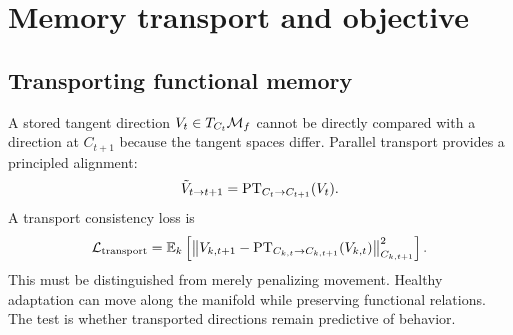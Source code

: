 \section{Memory transport and objective}

\subsection{Transporting functional memory}
A stored tangent direction $V_t\in T_{C_t}\mathcal{M}_f$ cannot be directly compared with a direction at $C_{t+1}$ because the tangent spaces differ. Parallel transport provides a principled alignment:
\begin{equation}
  \tilde V_{t\to t+1}
  = \operatorname{PT}_{C_t\to C_{t+1}}(V_t).
  \label{eq:parallel-transport}
\end{equation}
A transport consistency loss is
\begin{equation}
  \mathcal{L}_{\mathrm{transport}}
  = \mathbb{E}_k\left[
    \left\|V_{k,t+1}-\operatorname{PT}_{C_{k,t}\to C_{k,t+1}}(V_{k,t})\right\|_{C_{k,t+1}}^2
  \right].
  \label{eq:transport-loss}
\end{equation}
This must be distinguished from merely penalizing movement. Healthy adaptation can move along the manifold while preserving functional relations. The test is whether transported directions remain predictive of behavior.

